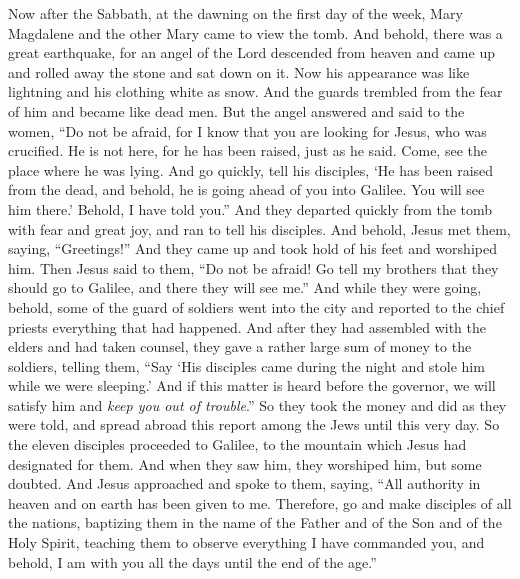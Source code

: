 \begin{biblechapter} %
 Now after the Sabbath, at the dawning on the first day of the week, Mary Magdalene and the other Mary came to view the tomb.
\verse And behold, there was a great earthquake, for an angel of the Lord descended from heaven and came up and rolled away the stone and sat down on it.
\verse Now his appearance was like lightning and his clothing white as snow.
\verse And the guards trembled from the fear of him and became like dead men.
\verse But the angel answered and said to the women, “Do not be afraid, for I know that you are looking for Jesus, who was crucified.
\verse He is not here, for he has been raised, just as he said. Come, see the place where he was lying.
\verse And go quickly, tell his disciples, ‘He has been raised from the dead, and behold, he is going ahead of you into Galilee. You will see him there.’ Behold, I have told you.”
\verse And they departed quickly from the tomb with fear and great joy, and ran to tell his disciples.
\verse And behold, Jesus met them, saying, “Greetings!” And they came up and took hold of his feet and worshiped him.
\verse Then Jesus said to them, “Do not be afraid! Go tell my brothers that they should go to Galilee, and there they will see me.”
 And while they were going, behold, some of the guard of soldiers went into the city and reported to the chief priests everything that had happened.
\verse And after they had assembled with the elders and had taken counsel, they gave a rather large sum of money to the soldiers,
\verse telling them, “Say ‘His disciples came during the night and stole him while we were sleeping.’
\verse And if this matter is heard before the governor, we will satisfy him and \textit{keep you out of trouble}.”
\verse So they took the money and did as they were told, and spread abroad this report among the Jews until this very day.
 So the eleven disciples proceeded to Galilee, to the mountain which Jesus had designated for them.
\verse And when they saw him, they worshiped him, but some doubted.
\verse And Jesus approached and spoke to them, saying, “All authority in heaven and on earth has been given to me.
\verse Therefore, go and make disciples of all the nations, baptizing them in the name of the Father and of the Son and of the Holy Spirit,
\verse teaching them to observe everything I have commanded you, and behold, I am with you all the days until the end of the age.”
\end{biblechapter}

